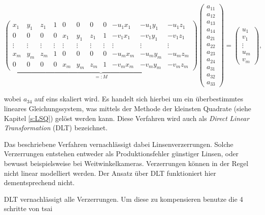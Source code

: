  \setcounter{MaxMatrixCols}{20}
\begin{equation}\label{eq:DLT}
\underbrace{\begin{pmatrix}
x_1 & y_1 & z_1 & 1 & 0 & 0 & 0 & 0 & -u_1 x_1 & -u_1 y_1 & -u_1z_1 \\
0 & 0 & 0 & 0 & x_1 & y_1 & z_1 & 1 & -v_1x_1 & -v_1y_1 & -v_1z_1 \\
\vdots & \vdots & \vdots & \vdots & \vdots & \vdots & \vdots & \vdots & \vdots & \vdots & \vdots\\
x_m & y_m & z_m & 1 & 0 & 0 & 0 & 0 & -u_m x_m & -u_m y_m & -u_m z_m \\
0 & 0 & 0 & 0 & x_m & y_m & z_m & 1 & -v_mx_m & -v_my_m & -v_mz_m
\end{pmatrix}}_{=:M}
\begin{pmatrix}
a_{11} \\ a_{12} \\ a_{13} \\ a_{14} \\ a_{21} \\ a_{22} \\ a_{23} \\ a_{24} \\ a_{31} \\ a_{32} \\ a_{33}
\end{pmatrix} = 
\begin{pmatrix}
u_1 \\ v_1 \\ \vdots \\ u_m \\ v_m
\end{pmatrix},
\end{equation}

wobei $a_{34}$ auf eins skaliert wird.  Es handelt sich hierbei um ein überbestimmtes lineares Gleichungssystem, was mittels der Methode der kleinsten Quadrate (siehe Kapitel \ref{s:LSQ}) gelöst werden kann. 
Diese Verfahren wird auch als \textit{Direct Linear Transformation} (DLT) bezeichnet.
 
Das beschriebene Verfahren vernachlässigt dabei Linsenverzerrungen. Solche Verzerrungen entstehen entweder als Produktionsfehler günstiger Linsen, oder bewusst beispielsweise bei Weitwinkelkameras. Verzerrungen können in der Regel nicht linear modelliert werden. Der Ansatz über DLT funktioniert hier dementsprechend nicht. 
 
 DLT vernachlässigt alle Verzerrungen. Um diese zu kompensieren benutze die 4 schritte von tsai
 


